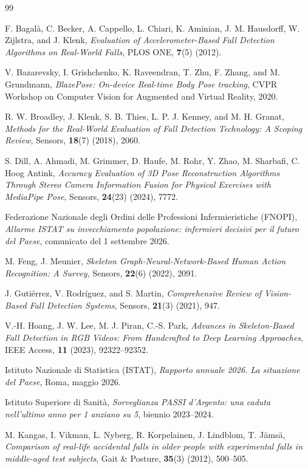 \begin{thebibliography}{99}

 F. Bagalà, C. Becker, A. Cappello, L. Chiari, K. Aminian,
J. M. Hausdorff, W. Zijlstra, and J. Klenk, {\it Evaluation of Accelerometer-Based Fall Detection Algorithms on Real-World Falls}, PLOS ONE, {\bf 7}(5) (2012).

 V. Bazarevsky, I. Grishchenko, K. Raveendran, T. Zhu, F. Zhang, and M. Grundmann, {\it BlazePose: On-device Real-time Body Pose tracking}, CVPR Workshop on Computer Vision for Augmented and Virtual Reality, 2020.

 R. W. Broadley, J. Klenk, S. B. Thies, L. P. J. Kenney, and M. H. Granat, {\it Methods for the Real-World Evaluation of Fall Detection Technology:
A Scoping Review}, Sensors, {\bf 18}(7) (2018), 2060.

 S. Dill, A. Ahmadi, M. Grimmer, D. Haufe, M. Rohr,
Y. Zhao, M. Sharbafi, C. Hoog Antink, {\it Accuracy Evaluation of 3D Pose
Reconstruction Algorithms Through Stereo Camera Information Fusion for
Physical Exercises with MediaPipe Pose}, Sensors, {\bf 24}(23) (2024), 7772.

 Federazione Nazionale degli Ordini delle Professioni
Infermieristiche (FNOPI), {\it Allarme ISTAT su invecchiamento popolazione:
infermieri decisivi per il futuro del Paese}, comunicato del 1 settembre 2026.

 M. Feng, J. Meunier, {\it Skeleton Graph-Neural-Network-Based
Human Action Recognition: A Survey}, Sensors, {\bf 22}(6) (2022), 2091.

 J. Gutiérrez, V. Rodríguez, and S. Martin, {\it Comprehensive Review of Vision-Based Fall Detection Systems}, Sensors, {\bf 21}(3) (2021), 947.

 V.-H. Hoang, J. W. Lee, M. J. Piran, C.-S. Park, {\it Advances in
Skeleton-Based Fall Detection in RGB Videos: From Handcrafted to Deep
Learning Approaches}, IEEE Access, {\bf 11} (2023), 92322--92352.

 Istituto Nazionale di Statistica (ISTAT), {\it Rapporto
annuale 2026. La situazione del Paese}, Roma, maggio 2026.

 Istituto Superiore di Sanità, {\it Sorveglianza PASSI d'Argento: una caduta nell'ultimo anno per 1 anziano su 5}, biennio 2023--2024.

 M. Kangas, I. Vikman, L. Nyberg, R. Korpelainen,
J. Lindblom, T. J\"ams\"a, {\it Comparison of real-life accidental falls in
older people with experimental falls in middle-aged test subjects}, Gait \&
Posture, {\bf 35}(3) (2012), 500--505.


\end{thebibliography}
